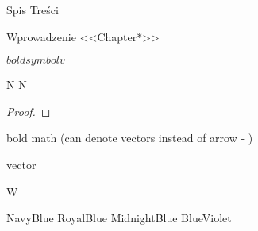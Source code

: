 \usepackage{blindtext}
\Blindtext[2][3] %






\renewcommand*{\tablename}{Tabela}

\tiny %



\begin{KeepFromToc}
Spis Treści
\end{KeepFromToc}

Wprowadzenie <<Chapter*>> %





$boldsymbol{v}$


{N}
{{N}}

\usepackage{amsthm}
\begin{proof}
\end{proof}

%
\bm bold math (can denote vectors instead of arrow - \vec)

%
\vec vector
\ge         %
\le         %
\permil     %
\neq        %
\Rightarrow %
\ast        %







%
\lettrine[lines=2]{\color{MidnightBlue}W}{}

NavyBlue
RoyalBlue
MidnightBlue
BlueViolet
\def\cthesissetcolorbluemagenta{%
	\cthesissetcolor{cmyk}{1, .50, .10, .01}{.18, .98, .18, 0}%
}

